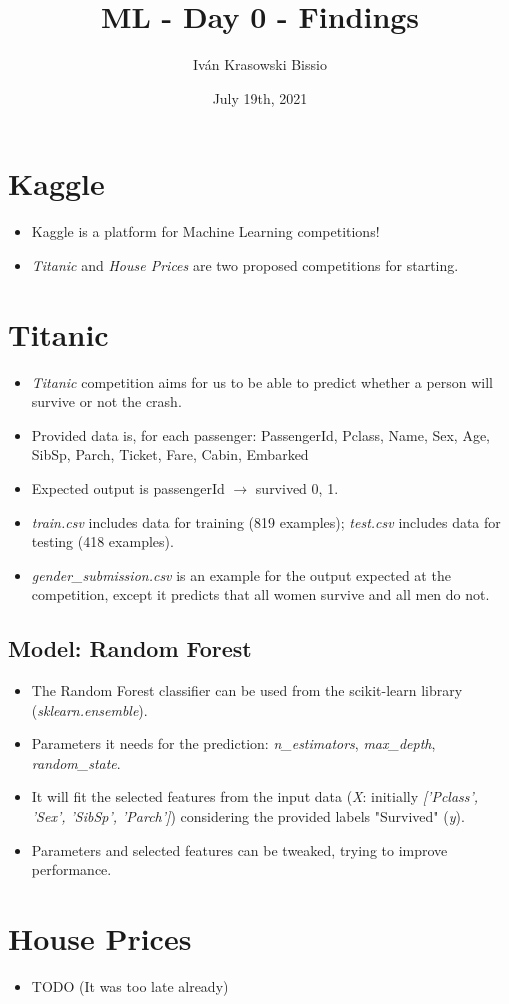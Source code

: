\documentclass{article}
\title{ML - Day 0 - Findings}
\author{Iván Krasowski Bissio}
\date{\small July 19th, 2021}
\begin{document}
\maketitle
\section*{Kaggle}
\begin{itemize}
    \item Kaggle is a platform for Machine Learning competitions!
    \item \emph{Titanic} and \emph{House Prices} are two proposed competitions for starting.
\end{itemize}
\section*{Titanic}
\begin{itemize}
    \item \emph{Titanic} competition aims for us to be able to predict whether a person will survive or not the crash.
    \item Provided data is, for each passenger: PassengerId, Pclass, Name, Sex, Age, SibSp, Parch, Ticket, Fare, Cabin, Embarked
    \item Expected output is passengerId \(\rightarrow\) survived {0, 1}.
    \item \emph{train.csv} includes data for training (819 examples); \emph{test.csv} includes data for testing (418 examples).
    \item \emph{gender\_submission.csv} is an example for the output expected at the competition, except it predicts that all women survive and all men do not.
\end{itemize}
\subsection*{Model: Random Forest}
\begin{itemize}
    \item The Random Forest classifier can be used from the scikit-learn library (\emph{sklearn.ensemble}).
    \item Parameters it needs for the prediction: \emph{n\_estimators}, \emph{max\_depth}, \emph{random\_state}.
    \item It will fit the selected features from the input data (\emph{X}: initially \emph{['Pclass', 'Sex', 'SibSp', 'Parch']}) considering the provided labels "Survived" (\emph{y}).
    \item Parameters and selected features can be tweaked, trying to improve performance.
\end{itemize}

\section*{House Prices}
\begin{itemize}
    \item TODO (It was too late already)
\end{itemize}
\end{document}
